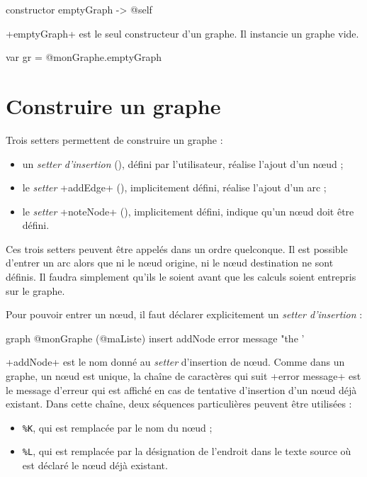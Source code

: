 \begin{galgas}
constructor emptyGraph -> @self
\end{galgas}

\ggs+emptyGraph+ est le seul constructeur d'un graphe. Il instancie un graphe vide.

\begin{galgas}
var gr = @monGraphe.emptyGraph 
\end{galgas}



\section{Construire un graphe}

Trois setters permettent de construire un graphe :
\begin{itemize}
  \item un \emph{setter d'insertion} (), défini par l'utilisateur, réalise l'ajout d'un nœud ;
  \item le \emph{setter} \ggs+addEdge+ (), implicitement défini, réalise l'ajout d'un arc ;
  \item le \emph{setter} \ggs+noteNode+ (), implicitement défini, indique qu'un nœud doit être défini.
\end{itemize}

Ces trois setters peuvent être appelés dans un ordre quelconque. Il est possible d'entrer un arc alors que ni le nœud origine, ni le nœud destination ne sont définis. Il faudra simplement qu'ils le soient avant que les calculs soient entrepris sur le graphe.


Pour pouvoir entrer un nœud, il faut déclarer explicitement un \emph{setter d'insertion} :
\begin{galgas}
graph @monGraphe (@maListe) {
  insert addNode error message "the '%
}
\end{galgas}

\ggs+addNode+ est le nom donné au \emph{setter} d'insertion de nœud. Comme dans un graphe, un nœud est unique, la chaîne de caractères qui suit \ggs+error message+ est le message d'erreur qui est affiché en cas de tentative d'insertion d'un nœud déjà existant. Dans cette chaîne, deux séquences particulières peuvent être utilisées :
\begin{itemize}
  \item \texttt{\%K}, qui est remplacée par le nom du nœud ;
  \item \texttt{\%L}, qui est remplacée par la désignation de l'endroit dans le texte source où est déclaré le nœud déjà existant.
\end{itemize}

